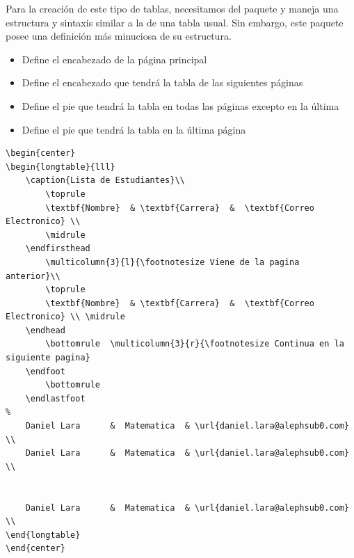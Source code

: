 \documentclass[a4,10pt]{aleph-notas}
\begin{document}
Para la creación de este tipo de tablas, necesitamos del paquete \verb@longtable@ y maneja una estructura y sintaxis similar a la de una tabla usual. Sin embargo, este paquete posee una definición más minuciosa de su estructura.

\begin{itemize}
    \item 
        \verb@\endfirsthead@ Define el encabezado de la página principal
    \item
        \verb@\endhead@
            Define el encabezado que tendrá la tabla de las siguientes páginas
    \item
        \verb@\endfoot@
            Define el pie que tendrá la tabla en todas las páginas excepto en la última
    \item
        \verb@\endlastfoot@
            Define el pie que tendrá la tabla en la última página
\end{itemize}

\begin{lstlisting}[frame=single]
\begin{center}
\begin{longtable}{lll}
    \caption{Lista de Estudiantes}\\
        \toprule
        \textbf{Nombre}  & \textbf{Carrera}  &  \textbf{Correo Electronico} \\
        \midrule
    \endfirsthead
        \multicolumn{3}{l}{\footnotesize Viene de la pagina anterior}\\
        \toprule
        \textbf{Nombre}  & \textbf{Carrera}  &  \textbf{Correo Electronico} \\ \midrule
    \endhead
        \bottomrule  \multicolumn{3}{r}{\footnotesize Continua en la siguiente pagina}
    \endfoot 
        \bottomrule
    \endlastfoot
%  
    Daniel Lara      &	Matematica	& \url{daniel.lara@alephsub0.com}  \\
    Daniel Lara      &	Matematica	& \url{daniel.lara@alephsub0.com}  \\

  
    Daniel Lara      &	Matematica	& \url{daniel.lara@alephsub0.com}  \\
\end{longtable}
\end{center}
\end{lstlisting}
\end{document}
